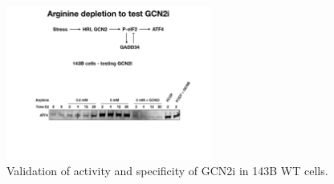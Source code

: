 \begin{figure}[t]
    \centering
    \includegraphics[width=0.60\textwidth]{figures/sapp/ISR/143B_GCN2i_val.pdf}
    \caption[GCN2 inhibitor validation]{
    Validation of activity and specificity of GCN2i in 143B WT cells.
    }
    \label{fig:sapp:ISR:143B_GCN2i_val}
\end{figure}

